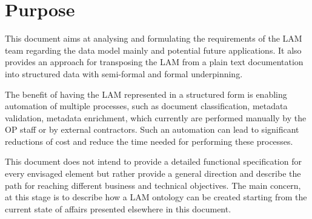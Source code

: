 \section{Purpose}\label{ariaid-title1}

This document aims at analysing and formulating the requirements of the
LAM team regarding the data model mainly and potential future
applications. It also provides an approach for transposing the LAM from
a plain text documentation into structured data with semi-formal and
formal underpinning.

The benefit of having the LAM represented in a structured form is
enabling automation of multiple processes, such as document
classification, metadata validation, metadata enrichment, which
currently are performed manually by the OP staff or by external
contractors. Such an automation can lead to significant reductions of
cost and reduce the time needed for performing these processes.

This document does not intend to provide a detailed functional
specification for every envisaged element but rather provide a general
direction and describe the path for reaching different business and
technical objectives. The main concern, at this stage is to describe how
a LAM ontology can be created starting from the current state of affairs
presented elsewhere in this document.
